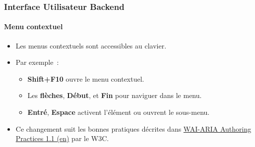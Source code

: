 %

\begin{frame}[fragile]
	\frametitle{Interface Utilisateur Backend}
	\framesubtitle{Menu contextuel}

	\begin{itemize}
		\item Les menus contextuels sont accessibles au clavier.
		\item Par exemple~:

			\begin{itemize}\small
				\item \textbf{Shift+F10} ouvre le menu contextuel.
				\item Les \textbf{flèches}, \textbf{Début}, et \textbf{Fin} pour naviguer dans le menu.
				\item \textbf{Entré}, \textbf{Espace} activent l'élément ou ouvrent le sous-menu.
			\end{itemize}

		\item Ce changement suit les bonnes pratiques décrites dans
			\href{https://www.w3.org/TR/wai-aria-practices-1.1/#keyboard-interaction-12}{WAI-ARIA Authoring Practices 1.1 (en)}
			par le W3C.

	\end{itemize}

\end{frame}

